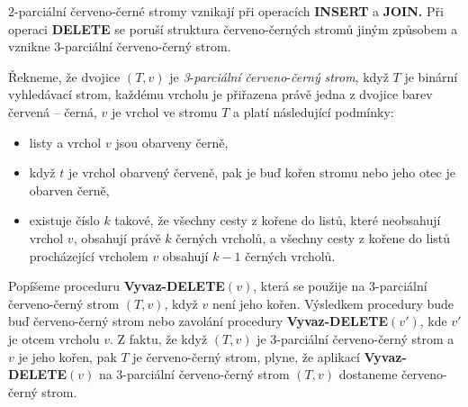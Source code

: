 \documentclass[a4paper,12pt]{article}
\begin{document}
$2$-parciální červeno-černé stromy vznikají při 
operacích {\bf INSERT} a {\bf JOIN.}  Při operaci {\bf DELETE} se poruší 
struktura červeno-černých stromů jiným 
způsobem a vznikne 3-parciální červeno-čer\-ný strom.  

Řekneme, že dvojice $(T,v)$ je \emph{3}-\emph{parciální} 
\emph{červeno}-\emph{černý} \emph{strom}, když $T$ je binární 
vy\-hledávací strom, každému vrcholu je při\-řazena právě jedna z 
dvojice barev červená -- černá, $v$ je vrchol ve stromu $
T$ a 
platí následující podmínky: 
\begin{itemize}
\item
listy a vrchol $v$ jsou obarveny černě,
\item
když $t$ je vrchol obarvený červeně, pak je buď kořen 
stromu nebo jeho otec je obarven černě,
\item
existuje číslo $k$ takové, že všechny cesty z kořene do 
listů, které neobsahují vrchol $v$, obsahují právě 
$k$ čer\-ných vrcholů, a všechny cesty z kořene do 
listů prochá\-ze\-jí\-cí vrcholem $v$ obsahují $
k-1$ černých 
vrcholů.
\end{itemize}

Popíšeme proceduru {\bf Vyvaz-DELETE$(v)$}, která se 
použije na 3-parciální červeno-černý strom $(T,v)$, když $
v$ není jeho 
kořen.  Výsledkem procedury bude buď červeno-černý strom 
nebo zavolání procedury {\bf Vyvaz-DELE\-TE$(v')$}, kde $v'$ je otcem 
vrcholu $v$.  Z faktu, že když $(T,v)$ je 3-parciální červeno-černý 
strom a $v$ je jeho kořen, pak $T$ je červeno-černý strom, plyne, 
že aplikací {\bf Vyvaz-DELETE$(v)$} na 3-parciální červeno-černý strom 
$(T,v)$ dostaneme červeno-černý strom.  
\end{document}
